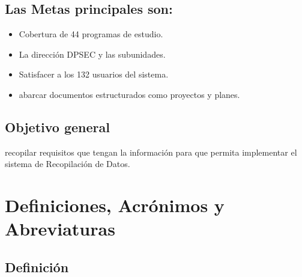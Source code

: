 \documentclass[12pt,a4paper]{article}
\begin{document}
\subsection*{Las Metas principales son:}
\begin{itemize}
    \item Cobertura de 44 programas de estudio.
    \item La dirección DPSEC y las subunidades.
    \item Satisfacer a los 132 usuarios del sistema.
    \item abarcar documentos estructurados como proyectos y planes.
    
    \end{itemize}
    
    
    \subsection*{Objetivo general }
    recopilar requisitos que tengan la información para que permita implementar el sistema de Recopilación de Datos.
    
    
    \section{Definiciones, Acrónimos y Abreviaturas}
    \subsection*{Definición}

    \printglossaries
\end{document}
